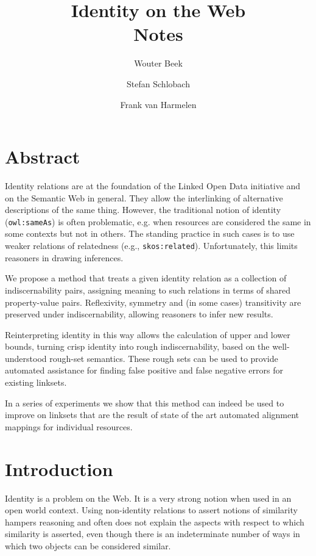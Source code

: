 \documentclass[11pt,a4paper,notitlepage,onecolumn,twoside]{article}
\title{Identity on the Web \\ Notes}
\author{Wouter Beek \and Stefan Schlobach \and Frank van Harmelen}
\begin{document}
\maketitle

\section{Abstract}

Identity relations are at the foundation of the Linked Open Data initiative
  and on the Semantic Web in general.
They allow the interlinking of alternative descriptions of the same thing.
However, the traditional notion of identity (\texttt{owl:sameAs}) is often
  problematic, e.g. when resources are considered the same in some contexts
  but not in others.
The standing practice in such cases is to use weaker relations of relatedness
  (e.g., \texttt{skos:related}).
Unfortunately, this limits reasoners in drawing inferences.

We propose a method that treats a given identity relation as a collection
  of indiscernability pairs, assigning meaning to such relations in terms
  of shared property-value pairs.
Reflexivity, symmetry and (in some cases) transitivity are preserved under
  indiscernability, allowing reasoners to infer new results.

Reinterpreting identity in this way allows the calculation of upper and
  lower bounds, turning crisp identity into rough indiscernability, based
  on the well-understood rough-set semantics.
These rough sets can be used to provide automated assistance for finding
  false positive and false negative errors for existing linksets.

In a series of experiments we show that this method can indeed be used to
  improve on linksets that are the result of state of the art automated
  alignment mappings for individual resources.

\section{Introduction}

Identity is a problem on the Web.
It is a very strong notion when used in an open world context.
Using non-identity relations to assert notions of similarity hampers
  reasoning and often does not explain the aspects with respect to which
  similarity is asserted, even though there is an indeterminate number of ways
  in which two objects can be considered similar.
\end{document}
